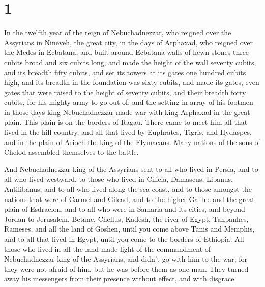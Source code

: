 \hypertarget{section}{%
\section{1}\label{section}}

 In the twelfth year of the reign of Nebuchadnezzar, who
reigned over the Assyrians in Nineveh, the great city, in the days of
Arphaxad, who reigned over the Medes in Ecbatana,  and built
around Ecbatana walls of hewn stones three cubits broad and six cubits
long, and made the height of the wall seventy cubits, and its breadth
fifty cubits,  and set its towers at its gates one hundred
cubits high, and its breadth in the foundation was sixty cubits,
 and made its gates, even gates that were raised to the
height of seventy cubits, and their breadth forty cubits, for his mighty
army to go out of, and the setting in array of his footmen---
 in those days king Nebuchadnezzar made war with king
Arphaxad in the great plain. This plain is on the borders of Ragau.
 There came to meet him all that lived in the hill country,
and all that lived by Euphrates, Tigris, and Hydaspes, and in the plain
of Arioch the king of the Elymaeans. Many nations of the sons of Chelod
assembled themselves to the battle.

 And Nebuchadnezzar king of the Assyrians sent to all who
lived in Persia, and to all who lived westward, to those who lived in
Cilicia, Damascus, Libanus, Antilibanus, and to all who lived along the
sea coast,  and to those amongst the nations that were of
Carmel and Gilead, and to the higher Galilee and the great plain of
Esdraelon,  and to all who were in Samaria and its cities,
and beyond Jordan to Jerusalem, Betane, Chellus, Kadesh, the river of
Egypt, Tahpanhes, Rameses, and all the land of Goshen, 
until you come above Tanis and Memphis, and to all that lived in Egypt,
until you come to the borders of Ethiopia.  All those who
lived in all the land made light of the commandment of Nebuchadnezzar
king of the Assyrians, and didn't go with him to the war; for they were
not afraid of him, but he was before them as one man. They turned away
his messengers from their presence without effect, and with disgrace.

